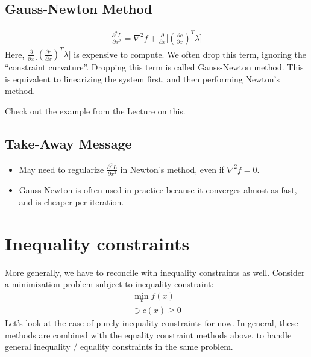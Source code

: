 \subsection{Gauss-Newton Method}
\begin{align}
    \frac{\partial^2 L}{\partial x^2} = \nabla^2 f + \frac{\partial}{\partial x} \big[ (\frac{\partial c}{\partial x})^T \lambda \big]
\end{align}
Here, $\frac{\partial}{\partial x} \big[ (\frac{\partial c}{\partial x})^T \lambda \big]$ is expensive to compute. We often drop this term, ignoring the ``constraint curvature''. 
Dropping this term is called Gauss-Newton method. This is equivalent to linearizing the system first, and then performing Newton's method. 

\noindent
Check out the example from the Lecture on this. 

\subsection{Take-Away Message}
\begin{itemize}
    \item May need to regularize $\frac{\partial^2 L}{\partial x^2}$ in Newton's method, even if $\nabla^2 f=0$. 
    \item Gauss-Newton is often used in practice because it converges almost as fast, and is cheaper per iteration. 
\end{itemize}

\section{Inequality constraints}
More generally, we have to reconcile with inequality constraints as well. Consider a minimization problem subject to inequality constraint: 
\begin{align}
    \min_x f(x) \\
    \ni c(x) \geq 0
\end{align}
Let's look at the case of purely inequality constraints for now. In general, these methods are combined with the equality constraint methods above, to handle general inequality / equality constraints  in the same problem. 

